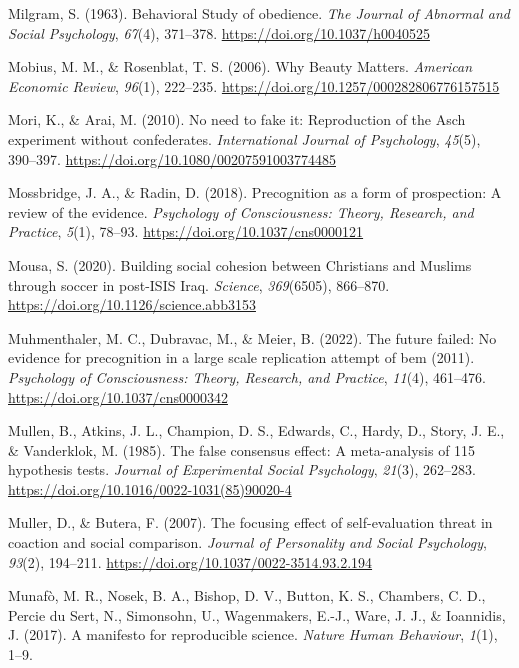 \documentclass[
  letterpaper,
]{book}
\newlength{\cslhangindent}
\newenvironment{CSLReferences}[2] %
 {\begin{list}{}{%
  \setlength{\itemindent}{0pt}
  \setlength{\leftmargin}{0pt}
  \setlength{\parsep}{0pt}
  \ifodd #1
   \setlength{\leftmargin}{\cslhangindent}
   \setlength{\itemindent}{-1\cslhangindent}
  \fi
  \setlength{\itemsep}{#2\baselineskip}}}
 {\end{list}}
\begin{document}
\begin{CSLReferences}{1}{0}
Milgram, S. (1963). Behavioral {Study} of obedience. \emph{The Journal
of Abnormal and Social Psychology}, \emph{67}(4), 371--378.
\url{https://doi.org/10.1037/h0040525}

Mobius, M. M., \& Rosenblat, T. S. (2006). Why {Beauty} {Matters}.
\emph{American Economic Review}, \emph{96}(1), 222--235.
\url{https://doi.org/10.1257/000282806776157515}

Mori, K., \& Arai, M. (2010). No need to fake it: {Reproduction} of the
{Asch} experiment without confederates. \emph{International Journal of
Psychology}, \emph{45}(5), 390--397.
\url{https://doi.org/10.1080/00207591003774485}

Mossbridge, J. A., \& Radin, D. (2018). Precognition as a form of
prospection: A review of the evidence. \emph{Psychology of
Consciousness: Theory, Research, and Practice}, \emph{5}(1), 78--93.
\url{https://doi.org/10.1037/cns0000121}

Mousa, S. (2020). Building social cohesion between {Christians} and
{Muslims} through soccer in post-{ISIS} {Iraq}. \emph{Science},
\emph{369}(6505), 866--870.
\url{https://doi.org/10.1126/science.abb3153}

Muhmenthaler, M. C., Dubravac, M., \& Meier, B. (2022). The future
failed: No evidence for precognition in a large scale replication
attempt of bem (2011). \emph{Psychology of Consciousness: Theory,
Research, and Practice}, \emph{11}(4), 461--476.
\url{https://doi.org/10.1037/cns0000342}

Mullen, B., Atkins, J. L., Champion, D. S., Edwards, C., Hardy, D.,
Story, J. E., \& Vanderklok, M. (1985). The false consensus effect: {A}
meta-analysis of 115 hypothesis tests. \emph{Journal of Experimental
Social Psychology}, \emph{21}(3), 262--283.
\url{https://doi.org/10.1016/0022-1031(85)90020-4}

Muller, D., \& Butera, F. (2007). The focusing effect of self-evaluation
threat in coaction and social comparison. \emph{Journal of Personality
and Social Psychology}, \emph{93}(2), 194--211.
\url{https://doi.org/10.1037/0022-3514.93.2.194}

Munafò, M. R., Nosek, B. A., Bishop, D. V., Button, K. S., Chambers, C.
D., Percie du Sert, N., Simonsohn, U., Wagenmakers, E.-J., Ware, J. J.,
\& Ioannidis, J. (2017). A manifesto for reproducible science.
\emph{Nature Human Behaviour}, \emph{1}(1), 1--9.


\end{CSLReferences}
\end{document}

